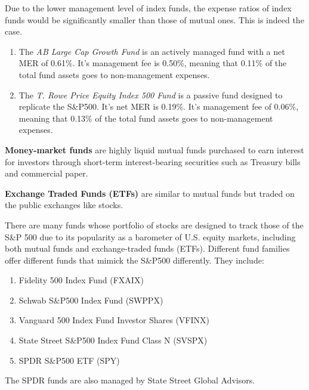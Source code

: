 \documentclass{article}
\begin{document}
      \begin{example}
        \label{ex:mers-of-index-vs-active-funds}
        Due to the lower management level of index funds, the expense ratios of index funds would be significantly smaller than those of mutual ones. This is indeed the case. 
        \begin{enumerate}
          \item The \textit{AB Large Cap Growth Fund} is an actively managed fund with a net MER of 0.61\%. It's management fee is 0.50\%, meaning that 0.11\% of the total fund assets goes to non-management expenses. 
          \item The \textit{T. Rowe Price Equity Index 500 Fund} is a passive fund designed to replicate the S\&P500. It's net MER is 0.19\%. It's management fee of 0.06\%, meaning that 0.13\% of the total fund assets goes to non-management expenses. 
        \end{enumerate}
      \end{example}

      \begin{definition}
        \label{def:money-market-funds}
        \textbf{Money-market funds} are highly liquid mutual funds purchased to earn interest for investors through short-term interest-bearing securities such as Treasury bills and commercial paper. 
      \end{definition}

      \begin{definition}
        \label{def:exchange-traded-funds}
        \textbf{Exchange Traded Funds (ETFs)} are similar to mutual funds but traded on the public exchanges like stocks. 
      \end{definition}

      \begin{example}[S\&P500 Funds]
        \label{ex:s-p500-funds}
        There are many funds whose portfolio of stocks are designed to track those of the S\&P 500 due to its popularity as a barometer of U.S. equity markets, including both mutual funds and exchange-traded funds (ETFs). Different fund families offer different funds that mimick the S\&P500 differently. They include: 
        \begin{enumerate}
          \item Fidelity 500 Index Fund (FXAIX)
          \item Schwab S\&P500 Index Fund (SWPPX)
          \item Vanguard 500 Index Fund Investor Shares (VFINX) 
          \item State Street S\&P500 Index Fund Class N (SVSPX)
          \item SPDR S\&P500 ETF (SPY)
        \end{enumerate}
        The SPDR funds are also managed by State Street Global Advisors. 
      \end{example}
\end{document}
